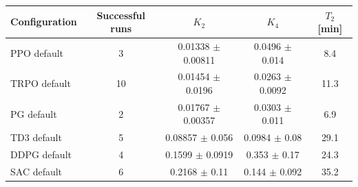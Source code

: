\begin{tabular}{lcccc}
\toprule
Configuration & Successful runs & $K_2$ & $K_4$ & $T_2$ [min] \\
\midrule
PPO default & 3 & 0.01338 $\pm$ 0.00811 & 0.0496 $\pm$ 0.014 & 8.4 \\
TRPO default & 10 & 0.01454 $\pm$ 0.0196 & 0.0263 $\pm$ 0.0092 & 11.3 \\
PG default & 2 & 0.01767 $\pm$ 0.00357 & 0.0303 $\pm$ 0.011 & 6.9 \\
TD3 default & 5 & 0.08857 $\pm$ 0.056 & 0.0984 $\pm$ 0.08 & 29.1 \\
DDPG default & 4 & 0.1599 $\pm$ 0.0919 & 0.353 $\pm$ 0.17 & 24.3 \\
SAC default & 6 & 0.2168 $\pm$ 0.11 & 0.144 $\pm$ 0.092 & 35.2 \\
\bottomrule
\end{tabular}
